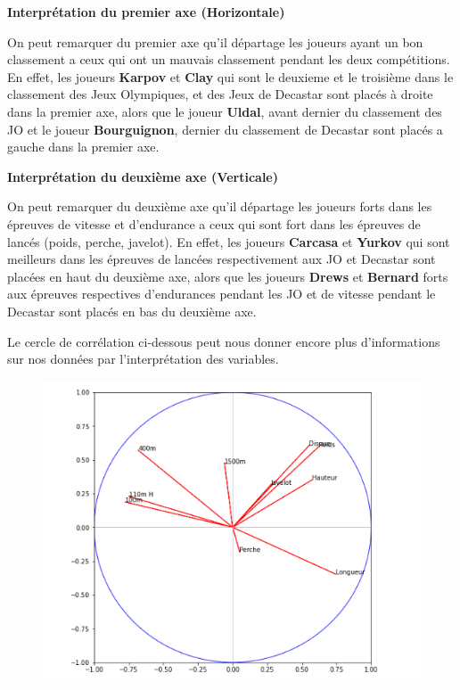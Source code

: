 \documentclass{article}
\begin{document}
\begin{flushleft}
\textbf{Interprétation du premier axe (Horizontale)}
\end{flushleft}

On peut remarquer du premier axe qu'il départage les joueurs ayant un bon classement a ceux qui ont un mauvais classement pendant les deux compétitions.
En effet, les joueurs \textbf{Karpov} et \textbf{Clay} qui sont le deuxieme et le troisième dans le classement des Jeux Olympiques, et des Jeux de Decastar sont placés à droite dans la premier axe, alors que le joueur \textbf{Uldal}, avant dernier du classement des JO et le joueur \textbf{Bourguignon}, dernier du classement de Decastar sont placés a gauche dans la premier axe. 

\begin{flushleft}
\textbf{Interprétation du deuxième axe (Verticale)}
\end{flushleft}

On peut remarquer du deuxième axe qu'il départage les joueurs forts dans les épreuves de vitesse et d'endurance a ceux qui sont fort dans les épreuves de lancés (poids, perche, javelot).
En effet, les joueurs \textbf{Carcasa} et \textbf{Yurkov} qui sont meilleurs dans les épreuves de lancées respectivement aux JO et Decastar sont placées en haut du deuxième axe, alors que les joueurs \textbf{Drews} et \textbf{Bernard} forts aux épreuves respectives d'endurances pendant les JO et de vitesse pendant le Decastar sont placés en bas du deuxième axe.

\newpage

Le cercle de corrélation ci-dessous peut nous donner encore plus d'informations sur nos données par l'interprétation des variables.

\begin{figure}[h!]
\includegraphics[width=\linewidth]{images/cercle_cor.png}
\end{figure}
\end{document}
